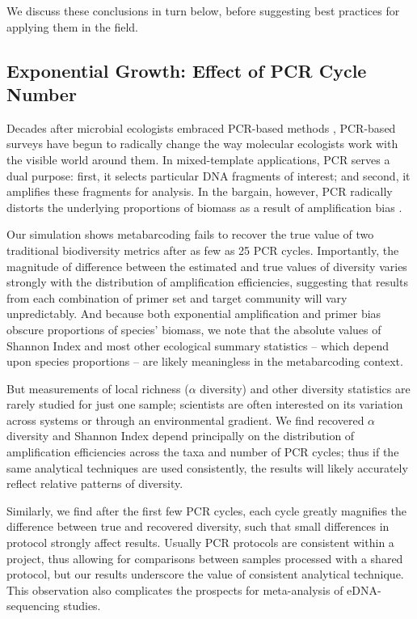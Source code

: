 \documentclass[fleqn,11pt,lineno]{wlscirep}
\begin{document}
We discuss these conclusions in turn below, before suggesting best practices for applying them in the field. 

\subsection*{Exponential Growth: Effect of PCR Cycle Number}

Decades after microbial ecologists embraced PCR-based methods \citep[e.g.,][]{fuhrman1993phylogenetic}, PCR-based surveys have begun to radically change the way molecular ecologists work with the visible world around them. In mixed-template applications, PCR serves a dual purpose: first, it selects particular DNA fragments of interest; and second, it amplifies these fragments for analysis. In the bargain, however, PCR radically distorts the underlying proportions of biomass as a result of amplification bias \cite{polz1998bias}. 

Our simulation shows metabarcoding fails to recover the true value of two traditional biodiversity metrics after as few as 25 PCR cycles. Importantly, the magnitude of difference between the estimated and true values of diversity varies strongly with the distribution of amplification efficiencies, suggesting that results from each combination of primer set and target community will vary unpredictably. And because both exponential amplification and primer bias obscure proportions of species' biomass, we note that the absolute values of Shannon Index and most other ecological summary statistics -- which depend upon species proportions -- are likely meaningless in the metabarcoding context. 

But measurements of local richness ($\alpha$ diversity) and other diversity statistics are rarely studied for just one sample; scientists are often interested on its variation across systems or through an environmental gradient. We find recovered $\alpha$ diversity and Shannon Index depend principally on the distribution of amplification efficiencies across the taxa and number of PCR cycles; thus if the same analytical techniques are used consistently, the results will likely accurately reflect relative patterns of diversity.

Similarly, we find after the first few PCR cycles, each cycle greatly magnifies the difference between true and recovered diversity, such that small differences in protocol strongly affect results. Usually PCR protocols are consistent within a project, thus allowing for comparisons between samples processed with a shared protocol, but our results underscore the value of consistent analytical technique. This observation also complicates the prospects for meta-analysis of eDNA-sequencing studies.
\end{document}
